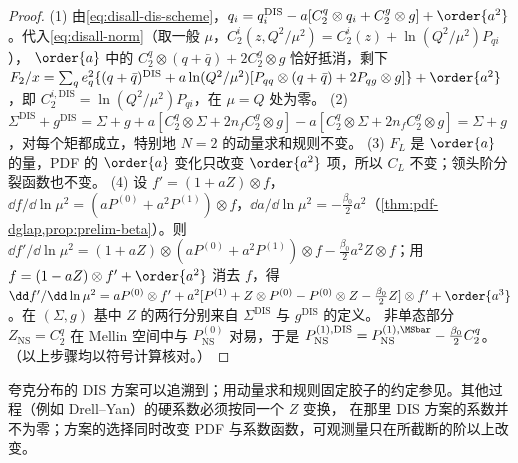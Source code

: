 \begin{proof}
(1) 由\cref{eq:disall-dis-scheme}，$q_i=q_i^{\mathrm{DIS}}-a[C_2^q\otimes q_i+C_2^g\otimes g]+\order{a^2}$。代入\cref{eq:disall-norm}（取一般 $\mu$，$C_2^i(z,Q^2/\mu^2)=C_2^i(z)+\ln(Q^2/\mu^2)P_{qi}$），
$\order{a}$ 中的 $C_2^q\otimes(q+\bar q)+2C_2^g\otimes g$ 恰好抵消，剩下
$F_2/x=\sum_qe_q^2\{(q+\bar q)^{\mathrm{DIS}}+a\ln(Q^2/\mu^2)[P_{qq}\otimes(q+\bar q)+2P_{qg}\otimes g]\}+\order{a^2}$，即 $C_2^{i,\mathrm{DIS}}=\ln(Q^2/\mu^2)P_{qi}$，在 $\mu=Q$ 处为零。
(2) $\Sigma^{\mathrm{DIS}}+g^{\mathrm{DIS}}=\Sigma+g+a[C_2^q\otimes\Sigma+2n_fC_2^g\otimes g]-a[C_2^q\otimes\Sigma+2n_fC_2^g\otimes g]=\Sigma+g$，对每个矩都成立，特别地 $N=2$ 的动量求和规则不变。
(3) $F_L$ 是 $\order{a}$ 的量，PDF 的 $\order{a}$ 变化只改变 $\order{a^2}$ 项，所以 $C_L$ 不变；领头阶分裂函数也不变。
(4) 设 $f'=(1+aZ)\otimes f$，$\dd f/\dd\ln\mu^2=(aP^{(0)}+a^2P^{(1)})\otimes f$，$\dd a/\dd\ln\mu^2=-\frac{\beta_0}2a^2$（\cref{thm:pdf-dglap,prop:prelim-beta}）。则
$\dd f'/\dd\ln\mu^2=(1+aZ)\otimes(aP^{(0)}+a^2P^{(1)})\otimes f-\frac{\beta_0}2a^2Z\otimes f$；用 $f=(1-aZ)\otimes f'+\order{a^2}$ 消去 $f$，得
$\dd f'/\dd\ln\mu^2=aP^{(0)}\otimes f'+a^2[P^{(1)}+Z\otimes P^{(0)}-P^{(0)}\otimes Z-\frac{\beta_0}2Z]\otimes f'+\order{a^3}$。在 $(\Sigma,g)$ 基中 $Z$ 的两行分别来自 $\Sigma^{\mathrm{DIS}}$ 与 $g^{\mathrm{DIS}}$ 的定义。
非单态部分 $Z_{\mathrm{NS}}=C_2^q$ 在 Mellin 空间中与 $P^{(0)}_{\mathrm{NS}}$ 对易，于是 $P^{(1),\mathrm{DIS}}_{\mathrm{NS}}=P^{(1),\MSbar}_{\mathrm{NS}}-\frac{\beta_0}2C_2^q$。
（以上步骤均以符号计算核对。）
\end{proof}

\noindent
夸克分布的 DIS 方案可以追溯到\cite{AltarelliEllisMartinelli1979}；用动量求和规则固定胶子的约定参见\cite{DiemozEtAl1988}。其他过程（例如 Drell--Yan）的硬系数必须按同一个 $Z$ 变换，
在那里 DIS 方案的系数并不为零；方案的选择同时改变 PDF 与系数函数，可观测量只在所截断的阶以上改变。

